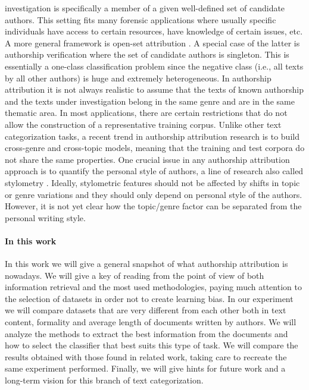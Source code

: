 investigation is specifically a member of a given
well-defined set of candidate authors. This setting fits many forensic applications where usually specific individuals have access to certain resources, have knowledge of certain issues, etc.
A more general framework is open-set attribution \cite{koppel2011authorship}. A special case of the latter is authorship verification where the set of candidate authors is singleton. This is essentially a one-class classification problem since the negative class (i.e., all texts by all other authors) is huge and extremely heterogeneous.
In authorship attribution it is not always realistic to assume that the texts of known authorship and the texts under investigation belong in
the same genre and are in the same thematic area.
In most applications, there are certain restrictions
that do not allow the construction of a representative training corpus. Unlike other text categorization tasks, a recent trend in authorship attribution research is to build cross-genre and cross-topic models, meaning that the training and test
corpora do not share the same properties.
One crucial issue in any authorship attribution approach is to quantify the personal style of authors, a line of research also called stylometry \cite{stamatatos2009survey}. Ideally, stylometric features should not be affected by shifts in topic or
genre variations and they should only depend on
personal style of the authors. However, it is not
yet clear how the topic/genre factor can be separated from the personal writing style.

\paragraph{In this work} In this work we will give a general snapshot of what authorship attribution is nowadays. We will give a key of reading from the point of view of both information retrieval and the most used methodologies, paying much attention to the selection of datasets in order not to create learning bias.
In our experiment we will compare datasets that are very different from each other both in text content, formality and average length of documents written by authors.
We will analyze the methods to extract the best information from the documents and how to select the classifier that best suits this type of task.
We will compare the results obtained with those found in related work, taking care to recreate the same experiment performed.
Finally, we will give hints for future work and a long-term vision for this branch of text categorization.

